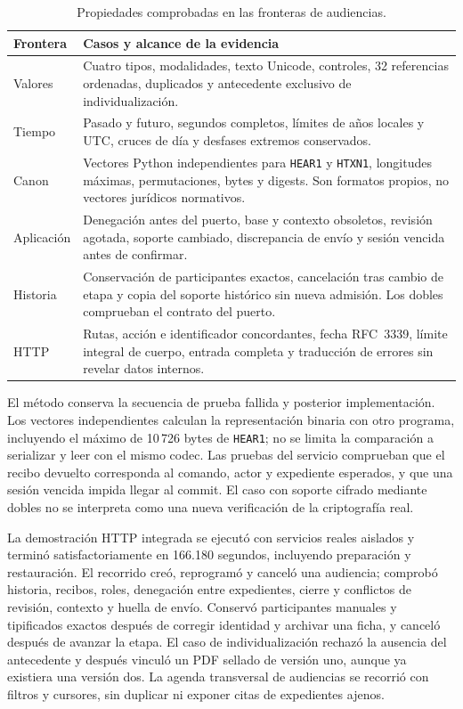 \begin{table}[H]
  \centering
  \caption{Propiedades comprobadas en las fronteras de audiencias.}
  \label{tab:pruebas-audiencias-fronteras}
  \begin{tabularx}{\linewidth}{@{}L{3.0cm} X@{}}
    \toprule
    \textbf{Frontera} & \textbf{Casos y alcance de la evidencia} \\
    \midrule
    Valores & Cuatro tipos, modalidades, texto Unicode, controles, 32 referencias ordenadas, duplicados y antecedente exclusivo de individualización. \\
    Tiempo & Pasado y futuro, segundos completos, límites de años locales y UTC, cruces de día y desfases extremos conservados. \\
    Canon & Vectores Python independientes para \texttt{HEAR1} y \texttt{HTXN1}, longitudes máximas, permutaciones, bytes y digests. Son formatos propios, no vectores jurídicos normativos. \\
    Aplicación & Denegación antes del puerto, base y contexto obsoletos, revisión agotada, soporte cambiado, discrepancia de envío y sesión vencida antes de confirmar. \\
    Historia & Conservación de participantes exactos, cancelación tras cambio de etapa y copia del soporte histórico sin nueva admisión. Los dobles comprueban el contrato del puerto. \\
    HTTP & Rutas, acción e identificador concordantes, fecha RFC~3339, límite integral de cuerpo, entrada completa y traducción de errores sin revelar datos internos. \\
    \bottomrule
  \end{tabularx}
\end{table}

El método conserva la secuencia de prueba fallida y posterior implementación. Los vectores independientes calculan la representación binaria con otro programa, incluyendo el máximo de 10\,726 bytes de \texttt{HEAR1}; no se limita la comparación a serializar y leer con el mismo codec. Las pruebas del servicio comprueban que el recibo devuelto corresponda al comando, actor y expediente esperados, y que una sesión vencida impida llegar al commit. El caso con soporte cifrado mediante dobles no se interpreta como una nueva verificación de la criptografía real.

La demostración HTTP integrada se ejecutó con servicios reales aislados y terminó satisfactoriamente en 166.180 segundos, incluyendo preparación y restauración. El recorrido creó, reprogramó y canceló una audiencia; comprobó historia, recibos, roles, denegación entre expedientes, cierre y conflictos de revisión, contexto y huella de envío. Conservó participantes manuales y tipificados exactos después de corregir identidad y archivar una ficha, y canceló después de avanzar la etapa. El caso de individualización rechazó la ausencia del antecedente y después vinculó un PDF sellado de versión uno, aunque ya existiera una versión dos. La agenda transversal de audiencias se recorrió con filtros y cursores, sin duplicar ni exponer citas de expedientes ajenos.

